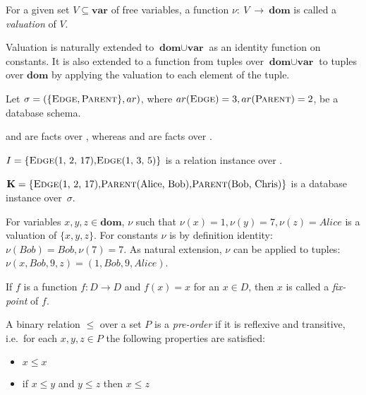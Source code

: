 \begin{defn}[Valuation]
For a given set $V \subseteq \textbf{var}$ of free variables, a function $\nu:~V~\to~\textbf{dom}$ is called a \emph{valuation} of $V$.
\end{defn}

Valuation is naturally extended to $\textbf{dom} \cup \textbf{var}$ as an identity function on constants. It is also extended to a function from tuples over $\textbf{dom} \cup \textbf{var}$ to tuples over $\textbf{dom}$ by applying the valuation to each element of the tuple.

\begin{exmp}
Let $\sigma = (\{\textsc{Edge}, \textsc{Parent}\}, ar)$, where  $ar(\textsc{Edge}) = 3, ar(\textsc{Parent}) = 2$, be a database schema. 

 and  are facts over , whereas  and  are facts over . 

$I = \{\relat{Edge}{(1, 2, 17)}, \relat{Edge}{(1, 3, 5)}\}$ is a relation instance over .

$\textbf{K} = \{\relat{Edge}{(1, 2, 17)}, \relat{Parent}{(Alice, Bob)}, \relat{Parent}{(Bob, Chris)}\}$ is a database instance over~$\sigma$.

For variables $x, y, z \in \textbf{dom}$, $\nu$ such that $\nu(x) = 1, \nu(y) = 7, \nu(z) = Alice$ is a valuation of $\{x, y, z\}$. For constants $\nu$ is by definition identity: $\nu(Bob) = Bob, \nu(7) = 7$. As natural extension, $\nu$ can be applied to tuples: $\nu(x, Bob, 9, z) = (1, Bob, 9, Alice)$.

\end{exmp}

\begin{defn}
If $f$ is a function $f: D \to D$ and $f(x) = x$ for an $x \in D$, then $x$ is called a \emph{fix-point} of $f$.
\end{defn}

\begin{defn}
A binary relation $\le$ over a set $P$ is a \emph{pre-order} if it is reflexive and transitive, i.e.\ for each $x, y, z \in P$ the following properties are satisfied:
\begin{itemize}
\item $x \le x$
\item if $x \le y$ and $y \le z$ then $x \le z$
\end{itemize}
\end{defn}

